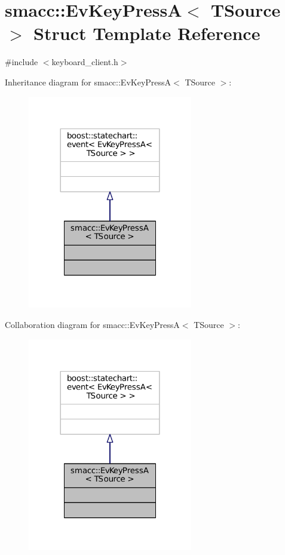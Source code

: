\hypertarget{structsmacc_1_1EvKeyPressA}{}\section{smacc\+:\+:Ev\+Key\+PressA$<$ T\+Source $>$ Struct Template Reference}
\label{structsmacc_1_1EvKeyPressA}


{\ttfamily \#include $<$keyboard\+\_\+client.\+h$>$}



Inheritance diagram for smacc\+:\+:Ev\+Key\+PressA$<$ T\+Source $>$\+:
\nopagebreak
\begin{figure}[H]
\begin{center}
\leavevmode
\includegraphics[width=204pt]{structsmacc_1_1EvKeyPressA__inherit__graph}
\end{center}
\end{figure}


Collaboration diagram for smacc\+:\+:Ev\+Key\+PressA$<$ T\+Source $>$\+:
\nopagebreak
\begin{figure}[H]
\begin{center}
\leavevmode
\includegraphics[width=204pt]{structsmacc_1_1EvKeyPressA__coll__graph}
\end{center}
\end{figure}


